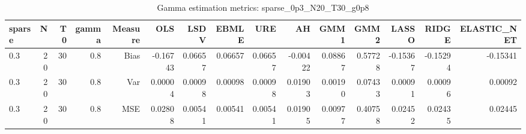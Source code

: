 \begin{table}[!htbp]\centering
\caption{Gamma estimation metrics: sparse_0p3_N20_T30_g0p8}
\label{tab:table1_sparse_0p3_N20_T30_g0p8}
\begin{tabular}{lrrrrrrrrrrrrrr}
\hline
sparse & N & T0 & gamma & Measure & OLS & LSDV & EBMLE & URE & AH & GMM1 & GMM2 & LASSO & RIDGE & ELASTIC_NET \\
\hline
0.3 & 20 & 30 & 0.8 & Bias & -0.16743 & 0.06657 & 0.06657 & 0.06657 & -0.00422 & 0.08867 & 0.57728 & -0.15367 & -0.15294 & -0.15341 \\
0.3 & 20 & 30 & 0.8 & Var & 0.00004 & 0.00098 & 0.00098 & 0.00098 & 0.01903 & 0.00190 & 0.07433 & 0.00091 & 0.00096 & 0.00092 \\
0.3 & 20 & 30 & 0.8 & MSE & 0.02808 & 0.00541 & 0.00541 & 0.00541 & 0.01905 & 0.00977 & 0.40758 & 0.02452 & 0.02435 & 0.02445 \\
\hline
\end{tabular}
\end{table}

